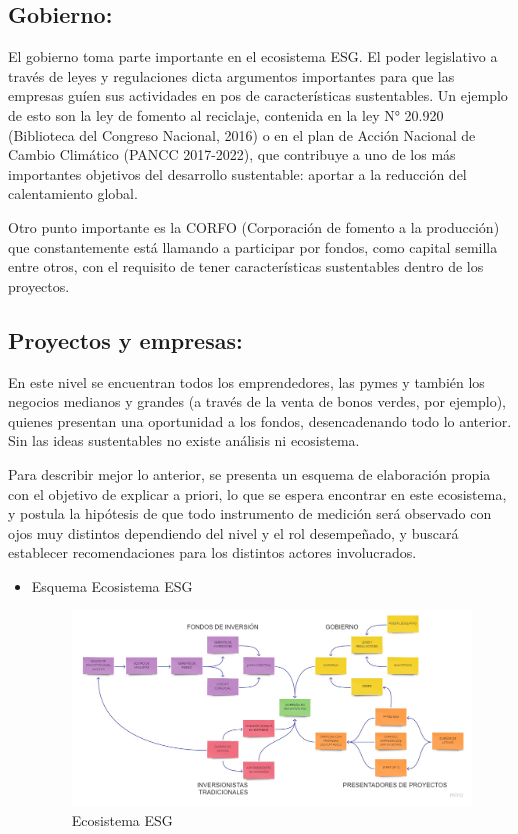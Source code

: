 \documentclass[11pt,letterpaper]{article}
\begin{document}
\subsection{Gobierno:}

El gobierno toma parte importante en el ecosistema ESG. El poder legislativo a través de leyes y regulaciones dicta argumentos importantes para que las empresas guíen sus actividades en pos de características sustentables. Un ejemplo de esto son la ley de fomento al reciclaje, contenida en la ley N° 20.920 (Biblioteca del Congreso Nacional, 2016) o en el plan de Acción Nacional de Cambio Climático (PANCC 2017-2022), que contribuye a uno de los más importantes objetivos del desarrollo sustentable: aportar a la reducción del calentamiento global. 

Otro punto importante es la CORFO (Corporación de fomento a la producción) que constantemente está llamando a participar por fondos, como capital semilla entre otros, con el requisito de tener características sustentables dentro de los proyectos. 

\subsection{Proyectos y empresas:}
En este nivel se encuentran todos los emprendedores, las pymes y también los negocios medianos y grandes (a través de la venta de bonos verdes, por ejemplo), quienes presentan una oportunidad a los fondos, desencadenando todo lo anterior. Sin las ideas sustentables no existe análisis ni ecosistema.

Para describir mejor lo anterior, se presenta un esquema de elaboración propia con el objetivo de explicar a priori, lo que se espera encontrar en este ecosistema, y postula la hipótesis de que todo instrumento de medición será observado con ojos muy distintos dependiendo del nivel y el rol desempeñado, y buscará establecer recomendaciones para los distintos actores involucrados.

\begin{itemize}
    \item Esquema Ecosistema ESG
        \begin{figure}[h]
            \centering
            \includegraphics[scale=0.2]{Concept Map - Frame 1.jpg}
            \caption{Ecosistema ESG}
        \end{figure}
\end{itemize}
\end{document}
